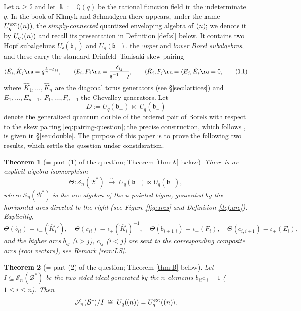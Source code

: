 \documentclass[11pt]{amsart}
\newtheorem{theorem}{Theorem}[section]
\theoremstyle{definition}
\newcommand{\BK}{\Bbbk}
\newcommand{\fb}{\mathfrak{b}}
\newcommand{\SN}{\mathscr{S}_n(\mathcal{B}^*)}
\newcommand{\iop}{\iota_{+}}
\newcommand{\iom}{\iota_{-}}
\newcommand{\hK}{\hat K}
\newcommand{\la}{\langle}
\begin{document}
Let $n\ge 2$ and let $\BK:=\mathbb{Q}(q)$ be the rational function field in the
indeterminate $q$. In the book of Klimyk and Schm\"udgen \cite{KS} there appears,
under the name $U_q^{\mathrm{ext}}(\sl(n))$, the \emph{simply-connected} quantized
enveloping algebra of $\sl(n)$; we denote it by $U_q(\sl(n))$ and recall its
presentation in Definition \ref{def:sl} below. It contains two Hopf subalgebras
$U_q(\fb_+)$ and $U_q(\fb_-)$, the \emph{upper} and \emph{lower Borel subalgebras},
and these carry the standard Drinfeld--Tanisaki skew pairing
\cite{Dr,KS,Tan,UvA}
\[
\la \hK_i,\hK_j\ra=q^{\frac1n-\delta_{ij}},\qquad
\la E_i,F_j\ra=\frac{\delta_{ij}}{q^{-1}-q},\qquad
\la \hK_i,F_j\ra=\la E_j,\hK_i\ra=0 ,
\tag{0.1}\label{eq:pairing-question}
\]
where $\hK_1,\dots,\hK_n$ are the diagonal torus generators (see
\S\ref{sec:lattices}) and $E_1,\dots,E_{n-1}$, $F_1,\dots,F_{n-1}$ the Chevalley
generators. Let
\[
D:=U_q(\fb_-)\,\bowtie\, U_q(\fb_+)
\]
denote the generalized quantum double of the ordered pair of Borels with respect
to the skew pairing \eqref{eq:pairing-question}; the precise construction, which
follows \cite{UvA,hal,Maj,Kas}, is given in \S\ref{sec:double}. The purpose of
this paper is to prove the following two results, which settle the question under
consideration.

\begin{theorem}[= part (1) of the question; Theorem \ref{thm:A} below]
\label{thm:introA}
There is an explicit algebra isomorphism
\[
\Theta:\SN\;\xrightarrow{\;\sim\;}\; U_q(\fb_-)\bowtie U_q(\fb_+),
\]
where $\SN$ is the arc algebra of the $n$-pointed bigon, generated by the
horizontal arcs directed to the right (see Figure \ref{fig:arcs} and Definition
\ref{def:arc}). Explicitly,
\[
\Theta(b_{ii})=\iom(\hK_i'),\quad \Theta(c_{ii})=\iop(\hK_i)^{-1},\quad
\Theta(b_{i+1,i})=\iom(F_i),\quad \Theta(c_{i,i+1})=\iop(E_i),
\]
and the higher arcs $b_{ij}$ ($i>j$), $c_{ij}$ ($i<j$) are sent to the
corresponding composite arcs (root vectors), see Remark \ref{rem:LS}.
\end{theorem}

\begin{theorem}[= part (2) of the question; Theorem \ref{thm:B} below]
\label{thm:introB}
Let $I\subseteq \SN$ be the two-sided ideal generated by the $n$ elements
$b_{ii}c_{ii}-1$ ($1\le i\le n$). Then
\[
\SN/I\;\cong\; U_q(\sl(n))=U_q^{\mathrm{ext}}(\sl(n)).
\]
\end{theorem}
\end{document}
